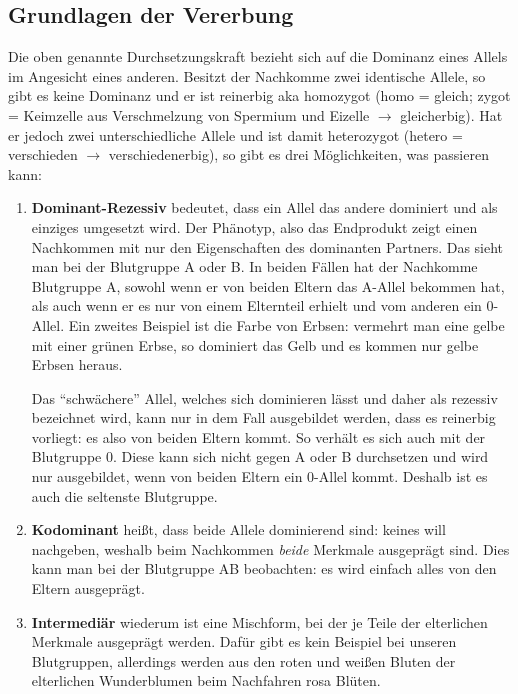 \subsection{Grundlagen der Vererbung}
Die oben genannte Durchsetzungskraft bezieht sich auf die Dominanz eines Allels im Angesicht eines anderen. 
Besitzt der Nachkomme zwei identische Allele, so gibt es keine Dominanz und er ist reinerbig aka homozygot (homo = gleich; zygot = Keimzelle aus Verschmelzung von Spermium und Eizelle $\rightarrow$ gleicherbig).
Hat er jedoch zwei unterschiedliche Allele und ist damit heterozygot (hetero = verschieden $\rightarrow$ verschiedenerbig), so gibt es drei Möglichkeiten, was passieren kann:

\begin{enumerate}
	\item \textbf{Dominant-Rezessiv} bedeutet, dass ein Allel das andere dominiert und als einziges umgesetzt wird. 
	Der Phänotyp, also das Endprodukt zeigt einen Nachkommen mit nur den Eigenschaften des dominanten Partners.
	Das sieht man bei der Blutgruppe A oder B.
	In beiden Fällen hat der Nachkomme Blutgruppe A, sowohl wenn er von beiden Eltern das A-Allel bekommen hat, als auch wenn er es nur von einem Elternteil erhielt und vom anderen ein 0-Allel.
	Ein zweites Beispiel ist die Farbe von Erbsen: vermehrt man eine gelbe mit einer grünen Erbse, so dominiert das Gelb und es kommen nur gelbe Erbsen heraus.
	
	Das "`schwächere"' Allel, welches sich dominieren lässt und daher als rezessiv bezeichnet wird, kann nur in dem Fall ausgebildet werden, dass es reinerbig vorliegt: es also von beiden Eltern kommt.
	So verhält es sich auch mit der Blutgruppe 0.
	Diese kann sich nicht gegen A oder B durchsetzen und wird nur ausgebildet, wenn von beiden Eltern ein 0-Allel kommt.
	Deshalb ist es auch die seltenste Blutgruppe.
	\item \textbf{Kodominant} heißt, dass beide Allele dominierend sind: keines will nachgeben, weshalb beim Nachkommen \textit{beide}  Merkmale ausgeprägt sind.
	Dies kann man bei der Blutgruppe AB beobachten: es wird einfach alles von den Eltern ausgeprägt.
	\item \textbf{Intermediär} wiederum ist eine Mischform, bei der je Teile der elterlichen Merkmale ausgeprägt werden. 
	Dafür gibt es kein Beispiel bei unseren Blutgruppen, allerdings werden aus den roten und weißen Bluten der elterlichen Wunderblumen beim Nachfahren rosa Blüten.
\end{enumerate}



